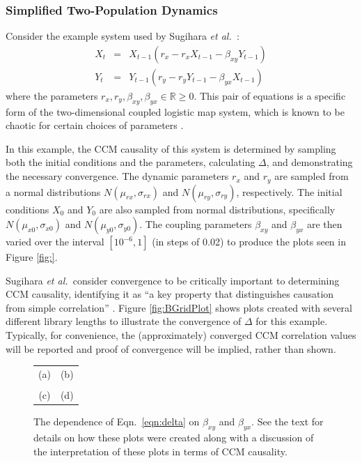 \documentclass[a4paper,11pt,twocolumn]{article}
\begin{document}
\subsubsection{Simplified Two-Population Dynamics}
\label{sec:2Pop}
Consider the example system used by Sugihara {\em et al.\ }\cite{Sugihara2012}:
\begin{eqnarray}
\label{eqn:2pop}
X_t &=& X_{t-1}\left(r_x-r_x X_{t-1}-\beta_{xy} Y_{t-1}\right)\\
Y_t &=& Y_{t-1}\left(r_y-r_y Y_{t-1}-\beta_{yx} X_{t-1}\right)
\end{eqnarray}
where the parameters $r_x,r_y,\beta_{xy},\beta_{yx}\in\mathbb{R}\ge 0$.  This pair of equations is a specific form of the two-dimensional coupled logistic map system, which is known to be chaotic for certain choices of parameters \cite{Lloyd1995}.

In this example, the CCM causality of this system is determined by sampling both the initial conditions and the parameters, calculating $\Delta$, and demonstrating the necessary convergence.  The dynamic parameters $r_x$ and $r_y$ are sampled from a normal distributions $N\left(\mu_{rx},\sigma_{rx}\right)$ and $N\left(\mu_{ry},\sigma_{ry}\right)$, respectively.  The initial conditions $X_0$ and $Y_0$ are also sampled from normal distributions, specifically $N\left(\mu_{x0},\sigma_{x0}\right)$ and $N\left(\mu_{y0},\sigma_{y0}\right)$.  The coupling parameters $\beta_{xy}$ and $\beta_{yx}$ are then varied over the interval $[10^{-6},1]$ (in steps of 0.02) to produce the plots seen in Figure \ref{fig:}.

Sugihara {\em et al.\ }consider convergence to be critically important to determining CCM causality, identifying it as ``a key property that distinguishes causation from simple correlation'' \cite{Sugihara2012}.  Figure \ref{fig:BGridPlot} shows plots created with several different library lengths to illustrate the convergence of $\Delta$ for this example.  Typically, for convenience, the (approximately) converged CCM correlation values will be reported and proof of convergence will be implied, rather than shown.
\begin{figure}[ht]
\label{fig:BGirdPlot}
\begin{tabular}{cc}
(a) & (b) \\[6pt]
 & \\
(c) & (d) \\[6pt]
\end{tabular}
\caption{The dependence of Eqn.\ \ref{eqn:delta} on $\beta_{xy}$ and $\beta_{yx}$.  See the text for details on how these plots were created along with a discussion of the interpretation of these plots in terms of CCM causality.}
\end{figure}
\end{document}

